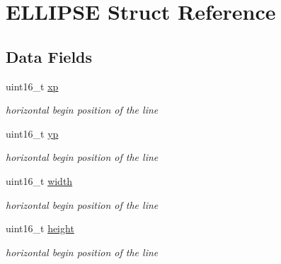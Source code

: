 \hypertarget{struct_e_l_l_i_p_s_e}{}\section{E\+L\+L\+I\+P\+SE Struct Reference}
\label{struct_e_l_l_i_p_s_e}
\subsection*{Data Fields}
\begin{DoxyCompactItemize}
\item 
\mbox{\label{struct_e_l_l_i_p_s_e_a949409b5dddb52782ff2cb935f4640fa}} 
uint16\+\_\+t \hyperlink{struct_e_l_l_i_p_s_e_a949409b5dddb52782ff2cb935f4640fa}{xp}
\begin{DoxyCompactList}\small\item\em horizontal begin position of the line \end{DoxyCompactList}\item 
\mbox{\label{struct_e_l_l_i_p_s_e_a59b81f7ac350cf9080d3d0b767580e4d}} 
uint16\+\_\+t \hyperlink{struct_e_l_l_i_p_s_e_a59b81f7ac350cf9080d3d0b767580e4d}{yp}
\begin{DoxyCompactList}\small\item\em horizontal begin position of the line \end{DoxyCompactList}\item 
\mbox{\label{struct_e_l_l_i_p_s_e_ad0eab1042455a2067c812ab8071d5376}} 
uint16\+\_\+t \hyperlink{struct_e_l_l_i_p_s_e_ad0eab1042455a2067c812ab8071d5376}{width}
\begin{DoxyCompactList}\small\item\em horizontal begin position of the line \end{DoxyCompactList}\item 
\mbox{\label{struct_e_l_l_i_p_s_e_a81c9f8d0b8c3b49d770be14dbe9f0d37}} 
uint16\+\_\+t \hyperlink{struct_e_l_l_i_p_s_e_a81c9f8d0b8c3b49d770be14dbe9f0d37}{height}
\begin{DoxyCompactList}\small\item\em horizontal begin position of the line \end{DoxyCompactList}\item 
\mbox{\label{struct_e_l_l_i_p_s_e_a2ffb43952012965173826ee9554c864a}} 

\end{DoxyCompactItemize}
